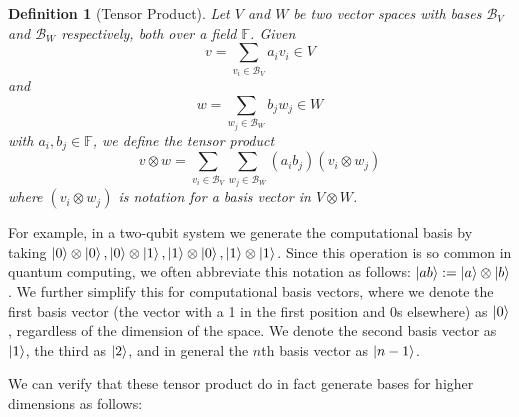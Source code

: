 \documentclass{article}
\renewcommand{\ket}{\Ket}
\theoremstyle{plain}
\theoremstyle{centered}
\newtheorem{definition}{Definition}
\renewcommand{\ket}{\Ket}
\newcommand{\tensor}{\otimes}
\newcommand{\bb}[1]{\mathbb{#1}}
\renewcommand{\cal}[1]{\mathcal{#1}}
\begin{document}
        
        \begin{definition}[Tensor Product]\label{def:tensor_product}
            Let $V$ and $W$ be two vector spaces with bases $\cal{B}_V$ and $\cal{B}_W$ respectively, both over a field $\bb{F}$.
            Given 
                $$v = \sum_{v_i \in \cal{B}_V} a_i v_i \in V$$ 
            and 
                $$w = \sum_{w_j \in \cal{B}_W} b_j w_j \in W$$
            with $a_i, b_j \in \bb{F}$, we define the \textit{tensor product} 
                $$v \otimes w = \sum_{v_i \in \cal{B}_V} \sum_{w_j \in \cal{B}_W} (a_i b_j) (v_i \otimes w_j)$$
            where $(v_i \otimes w_j)$ is notation for a basis vector in $V \otimes W$.
        \end{definition}
        For example, in a two-qubit system we generate the computational basis by taking $\ket{0} \tensor \ket{0}, \ket{0} \tensor \ket{1}, \ket{1} \tensor \ket{0}, \ket{1} \tensor \ket 1$.
        Since this operation is so common in quantum computing, we often abbreviate this notation as follows: $\ket{ab} := \ket{a} \tensor \ket{b}$.
        We further simplify this for computational basis vectors, where we denote the first basis vector (the vector with a 1 in the first position and 0s elsewhere) as $\ket{0}$, regardless of the dimension of the space.
        We denote the second basis vector as $\ket{1}$, the third as $\ket{2}$, and in general the $n$th basis vector as $\ket{n-1}$.

        We can verify that these tensor product do in fact generate bases for higher dimensions as follows:
        
\end{document}
